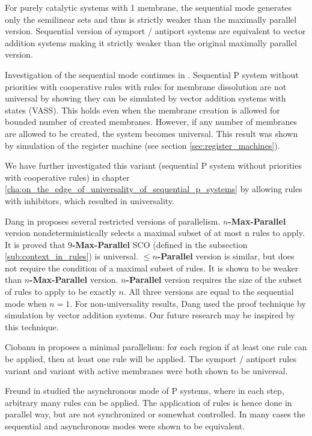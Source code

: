 For purely catalytic systems with 1 membrane, the sequential mode generates only the semilinear sets and thus is strictly weaker than the maximally parallel version.
Sequential version of symport / antiport systems are equivalent to vector addition systems making it strictly weaker than the original maximally parallel version.

Investigation of the sequential mode continues in \cite{Ibarra05Active}. Sequential P system without priorities with cooperative rules with rules for membrane dissolution are not universal by showing they can be simulated by vector addition systems with states (VASS).
This holds even when the membrane creation is allowed for bounded number of created membranes. However, if any number of membranes are allowed to be created, the system becomes universal. This result was shown by simulation of the register machine (see section \ref{sec:register_machines}).

We have further investigated this variant (sequential P system without priorities with cooperative rules) in chapter \ref{cha:on_the_edge_of_universality_of_sequential_p_systems} by allowing rules with inhibitors, which resulted in universality.



Dang in \cite{Ibarra04dang} proposes several restricted versions of parallelism.
$n${\bf -Max-Parallel} version nondeterministically selects a maximal subset of at most n rules to apply. It is proved that 9{\bf -Max-Parallel} SCO (defined in the subsection \ref{sub:context_in_rules}) is universal.
$\leq n${\bf -Parallel} version is similar, but does not require the condition of a maximal subset of rules. It is shown to be weaker than $n${\bf -Max-Parallel} version.
$n${\bf -Parallel} version requires the size of the subset of rules to apply to be exactly $n$.
All three versions are equal to the sequential mode when $n=1$. For non-universality results, Dang used the proof technique by simulation by vector addition systems. Our future research may be inspired by this technique.


Ciobanu in \cite{Ciobanu:2007:MinimalParallelism} proposes a minimal parallelism: for each region if at least one rule can be applied, then at least one rule will be applied. The symport / antiport rules variant and variant with active membranes were both shown to be universal.


Freund in \cite{Freund:2004:Async} studied the asynchronous mode of P systems, where in each step, arbitrary many rules can be applied. The application of rules is hence done in parallel way, but are not synchronized or somewhat controlled. In many cases the sequential and asynchronous modes were shown to be equivalent.

